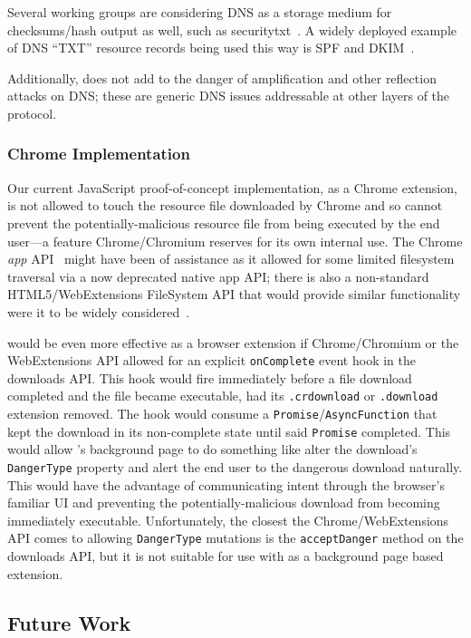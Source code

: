 Several working groups are considering DNS as a storage medium for
checksums/hash output as well, such as securitytxt~\cite{draft-sectxt}. A widely
deployed example of DNS ``TXT'' resource records being used this way is SPF and
DKIM~\cite{DKIM}.

Additionally, \SYSTEM{} does not add to the danger of amplification and other
reflection attacks on DNS; these are generic DNS issues addressable at other
layers of the protocol.

\subsubsection{Chrome Implementation}

Our current JavaScript proof-of-concept implementation, as a Chrome extension,
is not allowed to touch the resource file downloaded by Chrome and so cannot
prevent the potentially-malicious resource file from being executed by the end
user---a feature Chrome/Chromium reserves for its own internal use. The Chrome
\textit{app} API~\cite{AppAPI} might have been of assistance as it allowed for
some limited filesystem traversal via a now deprecated native app API; there is
also a non-standard HTML5/WebExtensions FileSystem API that would provide
similar functionality were it to be widely considered~\cite{deadSpec}.

\SYSTEM{} would be even more effective as a browser extension if Chrome/Chromium
or the WebExtensions API allowed for an explicit \texttt{onComplete} event hook
in the downloads API. This hook would fire immediately before a file download
completed and the file became executable, \ie had its \texttt{.crdownload} or
\texttt{.download} extension removed. The hook would consume a
\texttt{Promise}/\texttt{AsyncFunction} that kept the download in its
non-complete state until said \texttt{Promise} completed. This would allow
\SYSTEM{}'s background page to do something like alter the download's
\texttt{DangerType} property and alert the end user to the dangerous download
naturally. This would have the advantage of communicating intent through the
browser's familiar UI and preventing the potentially-malicious download from
becoming immediately executable. Unfortunately, the closest the
Chrome/WebExtensions API comes to allowing \texttt{DangerType} mutations is the
\texttt{acceptDanger} method on the downloads API, but it is not suitable for
use with \SYSTEM{} as a background page based extension.

\subsection{Future Work}

